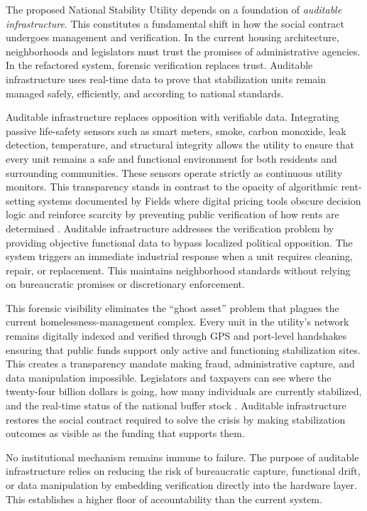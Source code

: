 \documentclass[12pt, letterpaper]{article}
\begin{document}
The proposed National Stability Utility depends on a foundation of \emph{auditable infrastructure}. This constitutes a fundamental shift in how the social contract undergoes management and verification. In the current housing architecture, neighborhoods and legislators must trust the promises of administrative agencies. In the refactored system, forensic verification replaces trust. Auditable infrastructure uses real-time data to prove that stabilization units remain managed safely, efficiently, and according to national standards.

Auditable infrastructure replaces opposition with verifiable data. Integrating passive life-safety sensors such as smart meters, smoke, carbon monoxide, leak detection, temperature, and structural integrity allows the utility to ensure that every unit remains a safe and functional environment for both residents and surrounding communities. These sensors operate strictly as continuous utility monitors. This transparency stands in contrast to the opacity of algorithmic rent-setting systems documented by Fields where digital pricing tools obscure decision logic and reinforce scarcity by preventing public verification of how rents are determined \citep{fields_2022}. Auditable infrastructure addresses the verification problem by providing objective functional data to bypass localized political opposition. The system triggers an immediate industrial response when a unit requires cleaning, repair, or replacement. This maintains neighborhood standards without relying on bureaucratic promises or discretionary enforcement.

This forensic visibility eliminates the ``ghost asset'' problem that plagues the current homelessness-management complex. Every unit in the utility's network remains digitally indexed and verified through GPS and port-level handshakes ensuring that public funds support only active and functioning stabilization sites. This creates a transparency mandate making fraud, administrative capture, and data manipulation impossible. Legislators and taxpayers can see where the twenty-four billion dollars is going, how many individuals are currently stabilized, and the real-time status of the national buffer stock \citep{ca_state_auditor_2024}. Auditable infrastructure restores the social contract required to solve the crisis by making stabilization outcomes as visible as the funding that supports them.

No institutional mechanism remains immune to failure. The purpose of auditable infrastructure relies on reducing the risk of bureaucratic capture, functional drift, or data manipulation by embedding verification directly into the hardware layer. This establishes a higher floor of accountability than the current system.
\end{document}
